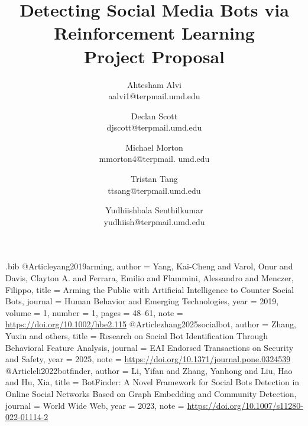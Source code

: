 \usepackage{filecontents}

\begin{filecontents}{\jobname.bib}
@Article{yang2019arming,
  author =       {Yang, Kai-Cheng and Varol, Onur and Davis, Clayton A. and Ferrara, Emilio and Flammini, Alessandro and Menczer, Filippo},
  title =        {Arming the Public with Artificial Intelligence to Counter Social Bots},
  journal =      {Human Behavior and Emerging Technologies},
  year =         2019,
  volume =       {1},
  number =       {1},
  pages =        {48--61},
  note =         {\url{https://doi.org/10.1002/hbe2.115}}
}
@Article{zhang2025socialbot,
  author =       {Zhang, Yuxin and others},
  title =        {Research on Social Bot Identification Through Behavioral Feature Analysis},
  journal =      {EAI Endorsed Transactions on Security and Safety},
  year =         2025,
  note =         {\url{https://doi.org/10.1371/journal.pone.0324539}}
}
@Article{li2022botfinder,
  author =       {Li, Yifan and Zhang, Yanhong and Liu, Hao and Hu, Xia},
  title =        {BotFinder: A Novel Framework for Social Bots Detection in Online Social Networks Based on Graph Embedding and Community Detection},
  journal =      {World Wide Web},
  year =         2023,
  note =         {\url{https://doi.org/10.1007/s11280-022-01114-2}}
}

\end{filecontents}



\date{}

\title{\Large \bf Detecting Social Media Bots via Reinforcement Learning\\
  Project Proposal}

\author{
{\rm Ahtesham Alvi}\\
aalvi1@terpmail.umd.edu
\and
{\rm Declan Scott}\\
djscott@terpmail.umd.edu
\\
\and
{\rm Michael Morton}\\
mmorton4@terpmail.
umd.edu
\and
{\rm Tristan Tang}\\
ttsang@terpmail.umd.edu
\\
\and
{\rm Yudhiishbala Senthilkumar}\\
yudhiish@terpmail.umd.edu
\\
}

